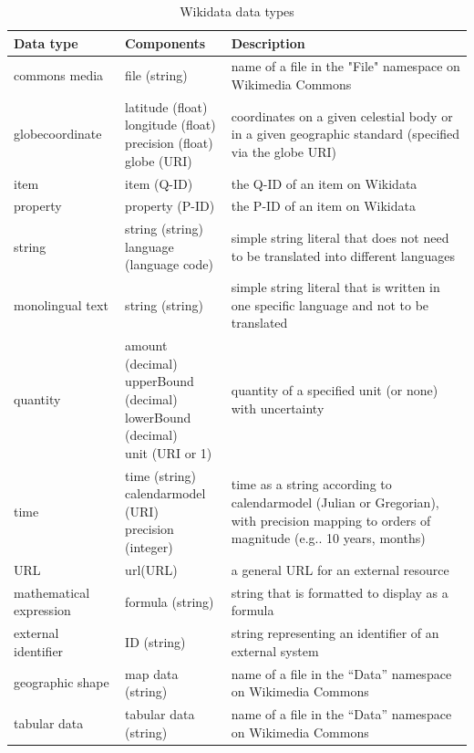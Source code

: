 \documentclass[hyperref,bachelorofscience,fleqn]{cgvpub}
\begin{document}
\begin{table}[H]
\caption{Wikidata data types}\label{tab_datatypes}
\begin{tabularx}{\textwidth}{llp{7cm}}
Data type & Components & Description \\
\hline
commons media & file (string) & name of a file in the "File" namespace on Wikimedia Commons \\
globecoordinate & \makecell{latitude (float) \\ longitude (float) \\ precision (float) \\ globe (URI)} & coordinates on a given celestial body or in a given geographic standard (specified via the globe URI) \\
item & item (Q-ID) & the Q-ID of an item on Wikidata \\
property & property (P-ID) & the P-ID of an item on Wikidata \\
string & \makecell{string (string) \\ language (language code)} & simple string literal that does not need to be translated into different languages \\
monolingual text & string (string) & simple string literal that is written in one specific language and not to be translated \\
quantity & \makecell {amount (decimal) \\ upperBound (decimal) \\ lowerBound (decimal) \\ unit (URI or 1)} & quantity of a specified unit (or none) with uncertainty \\
time & \makecell {time (string) \\ calendarmodel (URI) \\ precision (integer)} & time as a string according to calendarmodel (Julian or Gregorian), with precision mapping to orders of magnitude (e.g.. 10 years, months) \\
URL & url(URL) & a general URL for an external resource \\
mathematical expression & formula (string) & string that is formatted to display as a formula \\
external identifier & ID (string) & string representing an identifier of an external system \\
geographic shape & map data (string) & name of a file in the ``Data'' namespace on Wikimedia Commons \\
tabular data & tabular data (string) & name of a file in the ``Data'' namespace on Wikimedia Commons \\
\end{tabularx}
\end{table}
\end{document}
